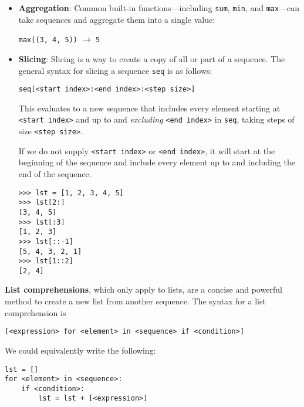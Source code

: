 \begin{itemize}
\begin{blocksection} 
\begin{lstlisting}
>>> for x in [1, 2, 3]:
...     print(x)
1
2
3
\end{lstlisting}
\end{blocksection}

\item \textbf{Aggregation}: Common built-in functions---including \lstinline{sum}, \lstinline{min}, and \lstinline{max}---can take sequences and aggregate them into a single value:

\lstinline{max((3, 4, 5))} $\rightarrow$ \lstinline{5}

\item \textbf{Slicing}: Slicing is a way to create a copy of all or part of a sequence. The general syntax for slicing a sequence \lstinline{seq} is as follows:
	\begin{lstlisting}
seq[<start index>:<end index>:<step size>]
	\end{lstlisting}

This evaluates to a new sequence that includes every element starting at \lstinline{<start index>} and up to and \textit{excluding} \lstinline{<end index>} in \lstinline{seq}, taking steps of size \lstinline{<step size>}. 

If we do not supply \lstinline{<start index>} or \lstinline{<end index>}, it will start at the beginning of the sequence and include every element up to and including the end of the sequence. 

\begin{lstlisting}
>>> lst = [1, 2, 3, 4, 5]
>>> lst[2:] 
[3, 4, 5]
>>> lst[:3] 
[1, 2, 3]
>>> lst[::-1] 
[5, 4, 3, 2, 1]
>>> lst[1::2] 
[2, 4]
\end{lstlisting}

\end{itemize}
\vspace{0.3 in}
\textbf{List comprehensions}, which only apply to lists, are a concise and powerful method to create a new list from another sequence. The syntax for a list comprehension is
   \begin{lstlisting}
[<expression> for <element> in <sequence> if <condition>]
   \end{lstlisting}

\begin{blocksection}
We could equivalently write the following: 
\begin{lstlisting}
lst = []
for <element> in <sequence>:
    if <condition>:
        lst = lst + [<expression>] 
\end{lstlisting}
\end{blocksection}

